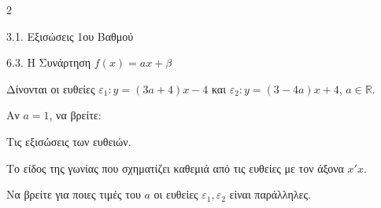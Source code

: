 \begin{ylh}{2}
    \item 3.1. Εξισώσεις 1ου Βαθμού
    \item 6.3. Η Συνάρτηση $f(x)=ax+\beta$
\end{ylh}
Δίνονται οι ευθείες $\varepsilon_1 : y = (3a + 4)x - 4$ και $\varepsilon_2 : y = (3 - 4a)x + 4$, $a \in \mathbb{R}$.
\begin{alist}
\item Αν $a=1$, να βρείτε:
\begin{rlist}
\item
  Τις εξισώσεις των ευθειών.
\item
  Το είδος της γωνίας που σχηματίζει καθεμιά από τις ευθείες με τον άξονα $x'x$.
\end{rlist}
\item Να βρείτε για ποιες τιμές του $a$ οι ευθείες $\varepsilon_1, \varepsilon_2$ είναι παράλληλες.
\end{alist}

